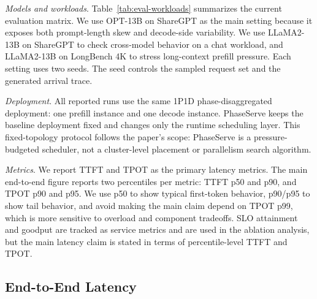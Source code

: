 \documentclass[lettersize,journal]{IEEEtran}
\begin{document}
\textit{Models and workloads}. Table~\ref{tab:eval-workloads} summarizes the current evaluation matrix. We use OPT-13B on ShareGPT as the main setting because it exposes both prompt-length skew and decode-side variability. We use LLaMA2-13B on ShareGPT to check cross-model behavior on a chat workload, and LLaMA2-13B on LongBench 4K \cite{longbench} to stress long-context prefill pressure. Each setting uses two seeds. The seed controls the sampled request set and the generated arrival trace.

\begin{table}[t]
\centering
\caption{Evaluation matrix used for the current end-to-end results.}
\label{tab:eval-workloads}
\end{table}

\textit{Deployment}. All reported runs use the same 1P1D phase-disaggregated deployment: one prefill instance and one decode instance. PhaseServe keeps the baseline deployment fixed and changes only the runtime scheduling layer. This fixed-topology protocol follows the paper's scope: PhaseServe is a pressure-budgeted scheduler, not a cluster-level placement or parallelism search algorithm.

\textit{Metrics}. We report TTFT and TPOT as the primary latency metrics. The main end-to-end figure reports two percentiles per metric: TTFT p50 and p90, and TPOT p90 and p95. We use p50 to show typical first-token behavior, p90/p95 to show tail behavior, and avoid making the main claim depend on TPOT p99, which is more sensitive to overload and component tradeoffs. SLO attainment and goodput are tracked as service metrics and are used in the ablation analysis, but the main latency claim is stated in terms of percentile-level TTFT and TPOT.

\subsection{End-to-End Latency}
\end{document}
